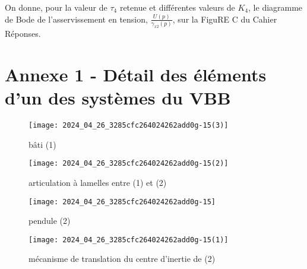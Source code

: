 

On donne, pour la valeur de $\tau_{4}$ retenue et différentes valeurs de $K_{4}$, le diagramme de Bode de l'asservissement en tension, $\frac{U(p)}{\gamma_{x 2}(p)}$, sur la FiguRE C du Cahier Réponses.



\section*{Annexe 1 - Détail des éléments d'un des systèmes du VBB}
\begin{figure}[!h]
\centering
\texttt{[image: 2024\_04\_26\_3285cfc264024262add0g-15(3)]}
\caption{\label{ccmp2023_fig_ann_1_1} bâti (1)}
\end{figure}



\begin{figure}[!h]
\centering
\texttt{[image: 2024\_04\_26\_3285cfc264024262add0g-15(2)]}
\caption{\label{ccmp2023_fig_ann_1_2}articulation à lamelles entre (1) et (2)}
\end{figure}



\begin{figure}[!h]
\centering
\texttt{[image: 2024\_04\_26\_3285cfc264024262add0g-15]}
\caption{\label{ccmp2023_ann_1_2} pendule (2)}
\end{figure}



\begin{figure}[!h]
\centering
\texttt{[image: 2024\_04\_26\_3285cfc264024262add0g-15(1)]}
\caption{\label{ccmp2023_ann_1_3}mécanisme de translation du centre d'inertie de (2)}
\end{figure}



